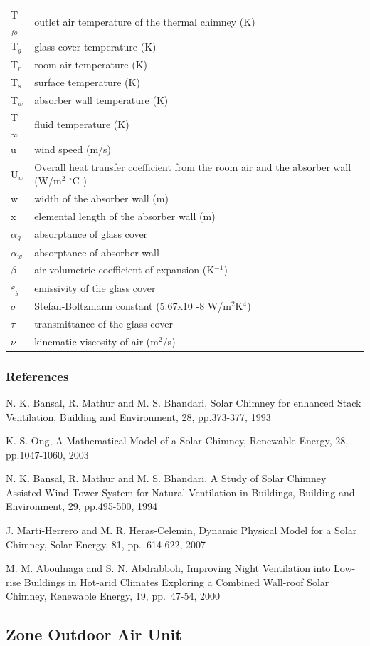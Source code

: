 \begin{longtable}[l]{p{1.5in}p{4.5in}}
T\(_{fo}\) & outlet air temperature of the thermal chimney (K) \tabularnewline
T\(_{g}\) & glass cover temperature (K) \tabularnewline
T\(_{r}\) & room air temperature (K) \tabularnewline
T\(_{s}\) & surface temperature (K) \tabularnewline
T\(_{w}\) & absorber wall temperature (K) \tabularnewline
T\(_{\infty}\) & fluid temperature (K) \tabularnewline
u & wind speed (m/s) \tabularnewline
U\(_{w}\) & Overall heat transfer coefficient from the room air and the absorber wall (W/m\(^{2}\)-\(^{\circ}\)C ) \tabularnewline
w & width of the absorber wall (m) \tabularnewline
x & elemental length of the absorber wall (m) \tabularnewline
$\alpha$\(_{g}\) & absorptance of glass cover \tabularnewline
$\alpha$\(_{w}\) & absorptance of absorber wall \tabularnewline
$\beta$ & air volumetric coefficient of expansion (K\(^{-1}\)) \tabularnewline
$\varepsilon$\(_{g}\) & emissivity of the glass cover \tabularnewline
$\sigma$ & Stefan-Boltzmann constant (5.67x10 -8 W/m\(^{2}\)K\(^{4}\)) \tabularnewline
$\tau$ & transmittance of the glass cover \tabularnewline
$\nu$ & kinematic viscosity of air (m\(^{2}\)/s) \tabularnewline
\bottomrule
\end{longtable}

\subsubsection{References}\label{references-7-000}

N. K. Bansal, R. Mathur and M. S. Bhandari, Solar Chimney for enhanced Stack Ventilation, Building and Environment, 28, pp.373-377, 1993

K. S. Ong, A Mathematical Model of a Solar Chimney, Renewable Energy, 28, pp.1047-1060, 2003

N. K. Bansal, R. Mathur and M. S. Bhandari, A Study of Solar Chimney Assisted Wind Tower System for Natural Ventilation in Buildings, Building and Environment, 29, pp.495-500, 1994

J. Marti-Herrero and M. R. Heras-Celemin, Dynamic Physical Model for a Solar Chimney, Solar Energy, 81, pp.~614-622, 2007

M. M. Aboulnaga and S. N. Abdrabboh, Improving Night Ventilation into Low-rise Buildings in Hot-arid Climates Exploring a Combined Wall-roof Solar Chimney, Renewable Energy, 19, pp.~47-54, 2000

\subsection{Zone Outdoor Air Unit}\label{zone-outdoor-air-unit}

